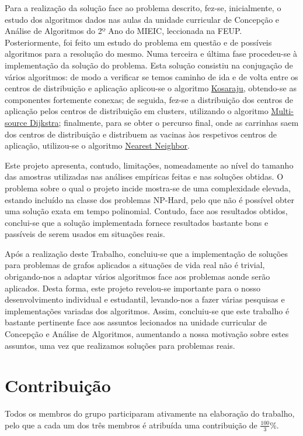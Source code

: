 \documentclass[12pt,a4paper]{report}
\begin{document}
Para a realização da solução face ao problema descrito, fez-se, inicialmente, o estudo dos algoritmos dados nas aulas da unidade curricular de Concepção e Análise de Algoritmos do 2º Ano 
do MIEIC, leccionada na FEUP. Posteriormente, foi feito um estudo do problema em questão e de possíveis algoritmos para a resolução do mesmo.
Numa terceira e última fase procedeu-se à implementação da solução do problema. Esta solução consistiu na conjugação de vários algoritmos:
de modo a verificar se temos caminho de ida e de volta entre os centros de distribuição e aplicação aplicou-se o algoritmo \hyperref[algo:kosaraju]{Kosaraju}, 
obtendo-se as componentes fortemente conexas; de seguida, fez-se a distribuição dos centros de aplicação pelos centros de distribuição em clusters, utilizando o 
algoritmo \hyperref[algo:msdijkstra]{Multi-source Dijkstra}; finalmente, para se obter o percurso final, onde as carrinhas saem dos centros de distribuição e distribuem
as vacinas àos respetivos centros de aplicação, utilizou-se o algoritmo \hyperref[algo:nn]{Nearest Neighbor}. \par

Este projeto apresenta, contudo, limitações, nomeadamente ao nível do tamanho das amostras utilizadas nas análises empíricas feitas e nas soluções obtidas. 
O problema sobre o qual o projeto incide mostra-se de uma complexidade elevada, estando incluído na classe dos problemas NP-Hard, pelo que não é possível obter
uma solução exata em tempo polinomial. Contudo, face aos resultados obtidos, conclui-se que a solução implementada fornece resultados bastante bons e passíveis de 
serem usados em situações reais.

Após a realização deste Trabalho, concluiu-se que a implementação de soluções para problemas de grafos aplicados a situações de vida real não é trivial, obrigando-nos a adaptar vários 
algoritmos face aos problemas aonde serão aplicados. Desta forma, este projeto revelou-se importante para o nosso desenvolvimento individual e 
estudantil, levando-nos a fazer várias pesquisas e implementações variadas dos algoritmos. Assim, concluiu-se que este trabalho
é bastante pertinente face aos assuntos lecionados na unidade curricular de Concepção e Análise de Algoritmos, aumentando a nossa motivação sobre estes assuntos, uma 
vez que realizamos soluções para problemas reais.


\chapter{Contribuição}
Todos os membros do grupo participaram ativamente na elaboração do trabalho, pelo que a cada um dos três membros é atribuída uma contribuição de \( \frac{100}{3} \% \).
\end{document}
